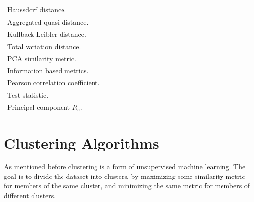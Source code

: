 \begin{table}[h]
\begin{tabular}{p{}p{}}
        Haussdorf distance.                 & \cite{temporal_tsc_threshold_ar_models, } \\
        Aggregated quasi-distance.          & \cite{BSLEX_nonlin_nonstat_tsc, } \\
        Kullback-Leibler distance.          & \cite{multivariate_tsc_hmm, } \\
        Total variation distance.           & \cite{tsc_total_variation_distance, } \\
        PCA similarity metric.              & \cite{wavelet_multivar_tsc_multi_pca} \\
        Information based metrics.          & \cite{dependency_tsc_energy_markets, } \\
        Pearson correlation coefficient.    & \cite{community_detection_networks_tsc, shape_feat_mod_tsc_rfa, fuzzy_c_means_pso_svd, } \\
        Test statistic.                    & \cite{fstar_hac_tsc} \\
        Principal component $R_e$.          & \cite{multivariate_tsc_common_pca} \\
        \bottomrule
    \end{tabular}
    \caption{}
    \label{tab:}
\end{table}

\section{Clustering Algorithms}
As mentioned before clustering is a form of unsupervised machine learning. 
The goal is to divide the dataset into clusters, by maximizing some similarity metric for members of the same cluster, and minimizing the same metric for members of different clusters.

